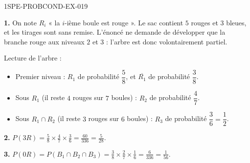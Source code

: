 \begin{corrige}{1SPE-PROBCOND-EX-019}

\textbf{1.} On note $R_i$ « la $i$-ième boule est rouge ». Le sac contient $5$ rouges et $3$ bleues, et les tirages sont sans remise. L'énoncé ne demande de développer que la branche rouge aux niveaux $2$ et $3$ : l'arbre est donc volontairement partiel.

\begin{nxarbreproba}
\end{nxarbreproba}

Lecture de l'arbre :

\begin{itemize}
  \item Premier niveau : $R_1$ de probabilité $\dfrac{5}{8}$, et $\overline{R_1}$ de probabilité $\dfrac{3}{8}$.
  \item Sous $R_1$ (il reste $4$ rouges sur $7$ boules) : $R_2$ de probabilité $\dfrac{4}{7}$.
  \item Sous $R_1 \cap R_2$ (il reste $3$ rouges sur $6$ boules) : $R_3$ de probabilité $\dfrac{3}{6} = \dfrac{1}{2}$.
\end{itemize}

\medskip

\textbf{2.} $P(3R) = \frac{5}{8} \times \frac{4}{7} \times \frac{3}{6} = \frac{60}{336} = \frac{5}{28}$.

\medskip
\textbf{3.} $P(0R) = P(B_1 \cap B_2 \cap B_3) = \frac{3}{8} \times \frac{2}{7} \times \frac{1}{6} = \frac{6}{336} = \frac{1}{56}$.

\end{corrige}
